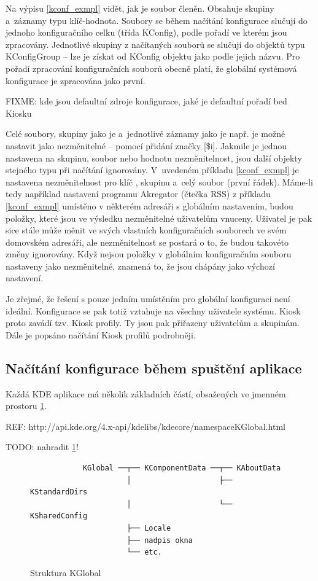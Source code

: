 Na výpisu \ref{kconf_exmpl} vidět, jak je soubor členěn. Obsahuje skupiny a~záznamy typu klíč-hodnota. Soubory se během načítání konfigurace slučují do jednoho konfiguračního celku (třída KConfig), podle pořadí ve kterém jsou zpracovány. Jednotlivé skupiny z načítaných souborů se slučují do objektů typu KConfigGroup -- lze je získat od KConfig objektu jako podle jejich názvu. Pro pořadí zpracování konfiguračních souborů obecně platí, že globální systémová konfigurace je zpracována jako první.

FIXME: kde jsou defaultní zdroje konfigurace, jaké je defaultní pořadí bed Kiosku

Celé soubory, skupiny jako je  a~jednotlivé záznamy jako je např. \linebreak{} je možné nastavit jako nezměnitelné --  pomocí přidání značky [\$i]. Jakmile je jednou nastavena na skupinu, soubor nebo hodnotu nezměnitelnost, jsou další objekty stejného typu při načítání ignorovány. V~uvedeném příkladu \ref{kconf_exmpl} je nastavena nezměnitelnost pro klíč , skupinu  a~celý soubor (první řádek). Máme-li tedy například nastavení programu Akregator (čtečka RSS) z příkladu \ref{kconf_exmpl} umístěno v některém adresáři s globálním nastavením, budou položky, které jsou ve výsledku nezměnitelné uživatelům vnuceny. Uživatel je pak sice stále může měnit ve svých vlastních konfiguračních souborech ve svém domovském adresáři, ale nezměnitelnost se postará o to, že budou takovéto změny ignorovány. Když nejsou položky v globálním konfiguračním souboru nastaveny jako nezměnitelné, znamená to, že jsou chápány jako výchozí nastavení.

Je zřejmé, že řešení s pouze jedním umístěním pro globální konfiguraci není ideální. Konfigurace se pak totiž vztahuje na všechny uživatele systému. Kiosk proto zavádí tzv. Kiosk profily. Ty jsou pak přiřazeny uživatelům a skupinám. Dále je popsáno načítání Kiosk profilů podrobněji.

\subsection*{Načítání konfigurace během spuštění aplikace}
Každá KDE aplikace má několik základních částí, obsažených ve jmenném prostoru  \ref{fig:kglobal}.

REF: http://api.kde.org/4.x-api/kdelibs/kdecore/namespaceKGlobal.html

TODO: nahradit \ref{fig:kglobal}!
\begin{figure}[h]
    \centering
    \begin{verbatim}
            KGlobal ──┬── KComponentData ──┬── KAboutData
                      │                    ├── KStandardDirs
                      │                    └── KSharedConfig
                      ├── Locale
                      ├── nadpis okna
                      └── etc.\end{verbatim}
    \caption{Struktura KGlobal}
    \label{fig:kglobal}
\end{figure}

